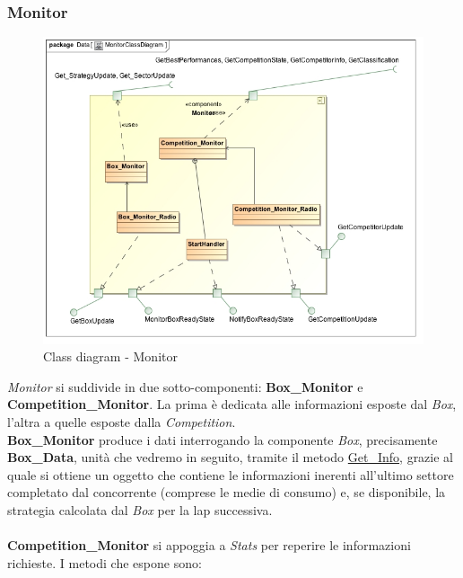 \subsubsection{Monitor}
\begin{center}
\begin{figure}[h!]
	\includegraphics[scale=0.50]{img/ClassDiagrams/MonitorClassDiagram.jpg}
\caption{Class diagram - Monitor}
\end{figure}
\end{center}
\emph{Monitor} si suddivide in due sotto-componenti: \textbf{Box\_Monitor} e \textbf{Competition\_Monitor}. La prima \`{e} dedicata alle informazioni
esposte dal \emph{Box}, l'altra a quelle esposte dalla \emph{Competition}.\\
\textbf{Box\_Monitor} produce i dati interrogando la componente \emph{Box}, precisamente \textbf{Box\_Data}, unit\`{a} che vedremo in seguito,
tramite il metodo \underline{Get\_Info}, grazie al quale si ottiene un oggetto che contiene le informazioni inerenti all'ultimo settore
completato dal concorrente (comprese le medie di consumo) e, se disponibile, la strategia calcolata dal \emph{Box} per la lap successiva.\\\\
\textbf{Competition\_Monitor} si appoggia a \emph{Stats} per reperire le informazioni richieste. I metodi che espone sono:
